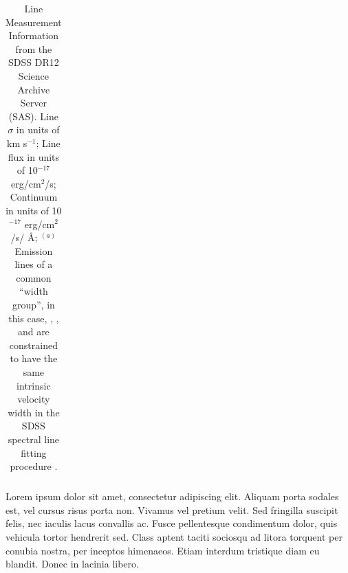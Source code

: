\documentclass[a4paper,fleqn,usenatbib]{mnras}
\begin{document}
\begin{table}
\begin{tabular}{l  lll  lll lll lll }
    \hline   
   \hline   
  \end{tabular}
  \caption{Line Measurement Information from the SDSS DR12 Science Archive Server (SAS). 
    Line $\sigma$ in units of   km s$^{-1}$; 
    Line flux          in units of  10$^{-17}$ erg/cm$^2$/s; 
    Continuum      in units of  10$^{-17}$ erg/cm$^2$/s/ \AA; 
    $^{(a)}$Emission lines of a common ``width group'', in this case,
    , ,  and  are constrained to have
    the same intrinsic velocity width in the SDSS spectral line fitting
    procedure \citep{Bolton2012}. 
  }
 \label{tab:SDSS_line_values}
\end{table}

Lorem ipsum dolor sit amet, consectetur adipiscing elit. Aliquam porta
sodales est, vel cursus risus porta non. Vivamus vel pretium
velit. Sed fringilla suscipit felis, nec iaculis lacus convallis
ac. Fusce pellentesque condimentum dolor, quis vehicula tortor
hendrerit sed. Class aptent taciti sociosqu ad litora torquent per
conubia nostra, per inceptos himenaeos. Etiam interdum tristique diam
eu blandit. Donec in lacinia libero.
\end{document}
